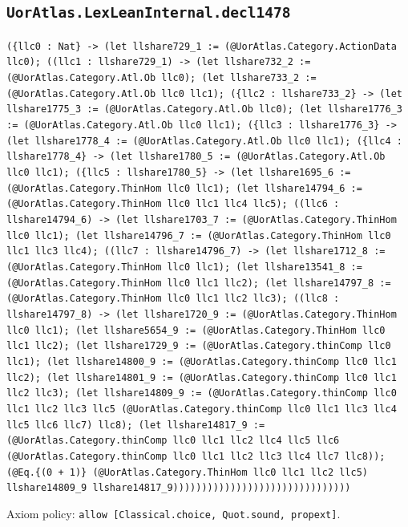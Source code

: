 \documentclass[11pt]{article}
\begin{document}
\subsection*{\texttt{UorAtlas.LexLeanInternal.decl1478}}
\noindent\texttt{(\{llc0 : Nat\} -> (let llshare729\_1 := (@UorAtlas.Category.ActionData llc0); ((llc1 : llshare729\_1) -> (let llshare732\_2 := (@UorAtlas.Category.Atl.Ob llc0); (let llshare733\_2 := (@UorAtlas.Category.Atl.Ob llc0 llc1); (\{llc2 : llshare733\_2\} -> (let llshare1775\_3 := (@UorAtlas.Category.Atl.Ob llc0); (let llshare1776\_3 := (@UorAtlas.Category.Atl.Ob llc0 llc1); (\{llc3 : llshare1776\_3\} -> (let llshare1778\_4 := (@UorAtlas.Category.Atl.Ob llc0 llc1); (\{llc4 : llshare1778\_4\} -> (let llshare1780\_5 := (@UorAtlas.Category.Atl.Ob llc0 llc1); (\{llc5 : llshare1780\_5\} -> (let llshare1695\_6 := (@UorAtlas.Category.ThinHom llc0 llc1); (let llshare14794\_6 := (@UorAtlas.Category.ThinHom llc0 llc1 llc4 llc5); ((llc6 : llshare14794\_6) -> (let llshare1703\_7 := (@UorAtlas.Category.ThinHom llc0 llc1); (let llshare14796\_7 := (@UorAtlas.Category.ThinHom llc0 llc1 llc3 llc4); ((llc7 : llshare14796\_7) -> (let llshare1712\_8 := (@UorAtlas.Category.ThinHom llc0 llc1); (let llshare13541\_8 := (@UorAtlas.Category.ThinHom llc0 llc1 llc2); (let llshare14797\_8 := (@UorAtlas.Category.ThinHom llc0 llc1 llc2 llc3); ((llc8 : llshare14797\_8) -> (let llshare1720\_9 := (@UorAtlas.Category.ThinHom llc0 llc1); (let llshare5654\_9 := (@UorAtlas.Category.ThinHom llc0 llc1 llc2); (let llshare1729\_9 := (@UorAtlas.Category.thinComp llc0 llc1); (let llshare14800\_9 := (@UorAtlas.Category.thinComp llc0 llc1 llc2); (let llshare14801\_9 := (@UorAtlas.Category.thinComp llc0 llc1 llc2 llc3); (let llshare14809\_9 := (@UorAtlas.Category.thinComp llc0 llc1 llc2 llc3 llc5 (@UorAtlas.Category.thinComp llc0 llc1 llc3 llc4 llc5 llc6 llc7) llc8); (let llshare14817\_9 := (@UorAtlas.Category.thinComp llc0 llc1 llc2 llc4 llc5 llc6 (@UorAtlas.Category.thinComp llc0 llc1 llc2 llc3 llc4 llc7 llc8)); (@Eq.\{(0 + 1)\} (@UorAtlas.Category.ThinHom llc0 llc1 llc2 llc5) llshare14809\_9 llshare14817\_9)))))))))))))))))))))))))))))))}\par
\noindent Axiom policy: \texttt{allow [Classical.choice, Quot.sound, propext]}.\par
\end{document}
